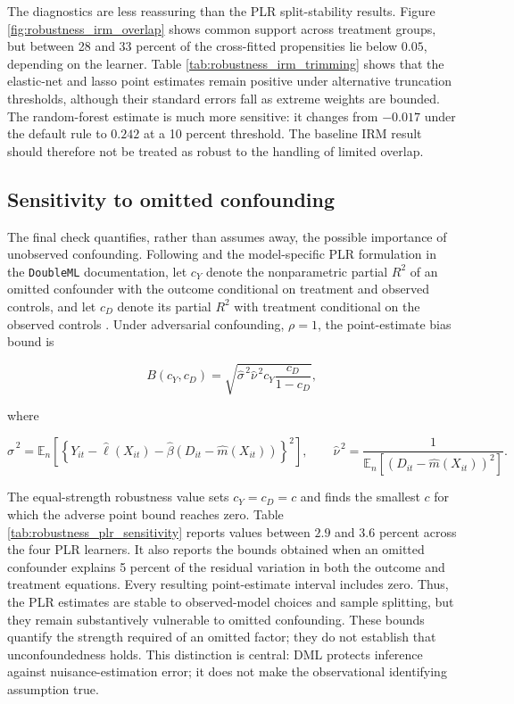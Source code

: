 \documentclass[11pt,oneside,a4paper]{book}
\begin{document}
The diagnostics are less reassuring than the PLR split-stability results. Figure \ref{fig:robustness_irm_overlap} shows common support across treatment groups, but between 28 and 33 percent of the cross-fitted propensities lie below \(0.05\), depending on the learner. Table \ref{tab:robustness_irm_trimming} shows that the elastic-net and lasso point estimates remain positive under alternative truncation thresholds, although their standard errors fall as extreme weights are bounded. The random-forest estimate is much more sensitive: it changes from \(-0.017\) under the default rule to \(0.242\) at a 10 percent threshold. The baseline IRM result should therefore not be treated as robust to the handling of limited overlap.

\subsection[Sensitivity to Omitted Confounding]{Sensitivity to omitted confounding}

The final check quantifies, rather than assumes away, the possible importance of unobserved confounding. Following \citet{chernozhukov2022ovb} and the model-specific PLR formulation in the \texttt{DoubleML} documentation, let \(c_Y\) denote the nonparametric partial \(R^2\) of an omitted confounder with the outcome conditional on treatment and observed controls, and let \(c_D\) denote its partial \(R^2\) with treatment conditional on the observed controls \citep{doubleml_docs2026}. Under adversarial confounding, \(\rho=1\), the point-estimate bias bound is

\[
B(c_Y,c_D)
=
\sqrt{\widehat{\sigma}^{\,2}\widehat{\nu}^{\,2}
c_Y\frac{c_D}{1-c_D}},
\]

where

\[
\widehat{\sigma}^{\,2}
=
\mathbb{E}_n\!\left[
\left\{Y_{it}-\widehat{\ell}(X_{it})
-\widehat{\beta}\left(D_{it}-\widehat{m}(X_{it})\right)\right\}^{2}
\right],
\qquad
\widehat{\nu}^{\,2}
=
\frac{1}{
\mathbb{E}_n\!\left[
\left(D_{it}-\widehat{m}(X_{it})\right)^2
\right]}.
\]

The equal-strength robustness value sets \(c_Y=c_D=c\) and finds the smallest \(c\) for which the adverse point bound reaches zero. Table \ref{tab:robustness_plr_sensitivity} reports values between \(2.9\) and \(3.6\) percent across the four PLR learners. It also reports the bounds obtained when an omitted confounder explains 5 percent of the residual variation in both the outcome and treatment equations. Every resulting point-estimate interval includes zero. Thus, the PLR estimates are stable to observed-model choices and sample splitting, but they remain substantively vulnerable to omitted confounding. These bounds quantify the strength required of an omitted factor; they do not establish that unconfoundedness holds. This distinction is central: DML protects inference against nuisance-estimation error; it does not make the observational identifying assumption true.
\end{document}
